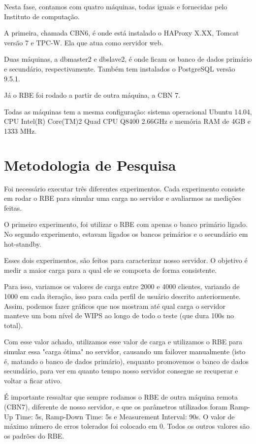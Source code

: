 \documentclass[11pt,twoside]{article}
\begin{document}
     Nesta fase, contamos com quatro máquinas, todas iguais e fornecidas pelo Instituto de computação.

     A primeira, chamada CBN6, é onde está instalado o HAProxy X.XX, Tomcat versão 7 e TPC-W. Ela que atua como servidor web.

     Duas máquinas, a dbmaster2 e dbslave2, é onde ficam os banco de dados primário e secundário, respectivamente. Também tem instalados o PostgreSQL vers\~ao 9.5.1.

     Já o RBE foi rodado a partir de outra máquina, a CBN 7.

     Todas as máquinas tem a mesma configuração: sistema operacional Ubuntu 14.04, CPU Intel(R) Core(TM)2 Quad CPU Q8400 2.66GHz e mem\'oria RAM de 4GB e 1333 MHz.

\section{Metodologia de Pesquisa}
\setlength{\parindent}{4ex}
Foi necessário executar três diferentes experimentos. Cada experimento consiste em rodar o RBE para simular uma carga no servidor e avaliarmos as medições feitas.

O primeiro experimento, foi utilizar o RBE com apenas o banco primário ligado. No segundo experimento, estavam ligados os bancos primários e o secundário em hot-standby.

Esses dois experimentos, são feitos para caracterizar nosso servidor. O objetivo é medir a maior carga para a qual ele se comporta de forma consistente.

Para isso, variamos os valores de carga entre 2000 e 4000 clientes, variando de 1000 em cada iteração, isso para cada perfil de usuário descrito anteriormente. Assim, podemos fazer gráficos que nos mostram até qual carga o servidor manteve um bom nível de WIPS ao longo de todo o teste (que dura 100s no total).

Com esse valor achado, utilizamos esse valor de carga e utilizamos o RBE para simular essa "carga ótima" no servidor, causando um failover  manualmente (isto é, matando o banco de dados primário), enquanto promovemos o banco de dados secundário, para ver em quanto tempo nosso servidor consegue se recuperar e voltar a ficar ativo.

É importante ressaltar que sempre rodamos o RBE de outra máquina remota (CBN7), diferente de nosso servidor, e que os parâmetros utilizados foram Ramp-Up Time: 5s, Ramp-Down Time: 5s e Measurement Interval: 90s. O valor de máximo número de erros tolerados foi colocado em 0. Todos os outros valores são os padrões do RBE.
\end{document}
